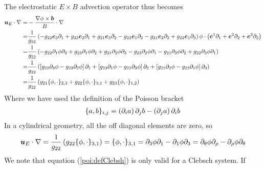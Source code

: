%
The electrostatic $E\times B$ advection operator thus becomes
%
\begin{align*}
    \boldsymbol{u}_E\cdot\nabla
    =& -\frac{\nabla\phi\times\boldsymbol{b}}{B}\cdot\nabla\\
    =&\frac{1}{g_{22}}
           \left(
           - g_{22}\boldsymbol{e}_3\partial_1
           + g_{23}\boldsymbol{e}_2\partial_1
           + g_{21}\boldsymbol{e}_3\partial_2
           - g_{23}\boldsymbol{e}_1\partial_2
           - g_{21}\boldsymbol{e}_2\partial_3
           + g_{22}\boldsymbol{e}_1\partial_3
           \right)
           \phi
       \cdot\left(\boldsymbol{e}^1\partial_1 + \boldsymbol{e}^2\partial_2 + \boldsymbol{e}^3\partial_3\right)\\
    =& \frac{1}{g_{22}}
           \left(
           - g_{22}\partial_1\phi\partial_3
           + g_{23}\partial_1\phi\partial_2
           + g_{21}\partial_2\phi\partial_3
           - g_{23}\partial_2\phi\partial_1
           - g_{21}\partial_3\phi\partial_2
           + g_{22}\partial_3\phi\partial_1
           \right)\\
    =& \frac{1}{g_{22}}
           \left(
             \left[
               g_{22}\partial_3\phi
             - g_{23}\partial_2\phi
             \right]\partial_1
           +
             \left[
               g_{23}\partial_1\phi
             - g_{21}\partial_3\phi
             \right]\partial_2
           +
             \left[
               g_{21}\partial_2\phi
             - g_{22}\partial_1\phi
             \right]\partial_3
           \right)\\
    =& \frac{1}{g_{22}}
               \left(
                 g_{21}\{\phi, \cdot\}_{2,3}
                 +
                 g_{22}\{\phi, \cdot\}_{3,1}
                 +
                 g_{23}\{\phi, \cdot\}_{1,2}
               \right)
\end{align*}
%
Where we have used the definition of the Poisson bracket
%
\begin{align*}
    \{a, b\}_{i,j} =
      \left(\partial_i a\right) \partial_j b
    - \left(\partial_j a\right) \partial_i b
\end{align*}
%
In a cylindrical geometry, all the off diagonal elements are zero, so
%
\begin{align}
    \boldsymbol{u}_E\cdot\nabla
    = \frac{1}{g_{22}} \left( g_{22}\{\phi, \cdot\}_{3,1} \right)
    = \{\phi, \cdot\}_{3,1}
    = \partial_3\phi\partial_1 - \partial_1\phi\partial_3
    = \partial_\theta\phi\partial_\rho - \partial_\rho\phi\partial_\theta
    \label{poi:defClebsh}
\end{align}
%
We note that equation (\ref{poi:defClebsh}) is only valid for a Clebsch system. If
